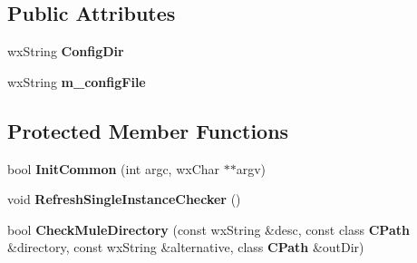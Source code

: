 \subsection*{Public Attributes}
\begin{DoxyCompactItemize}
\item 
wxString {\bfseries ConfigDir}\label{classCamuleAppCommon_a8758418dcb973cb38bc0d5e9db484226}

\item 
wxString {\bfseries m\_\-configFile}\label{classCamuleAppCommon_a0666bf85cc29b760f2d32f9fb4047853}

\end{DoxyCompactItemize}
\subsection*{Protected Member Functions}
\begin{DoxyCompactItemize}
\item 
bool {\bfseries InitCommon} (int argc, wxChar $\ast$$\ast$argv)\label{classCamuleAppCommon_a0a2205f860322c357897456126db69a5}

\item 
void {\bfseries RefreshSingleInstanceChecker} ()\label{classCamuleAppCommon_a73f5608da6911b4b2d9df186f61eed23}

\item 
bool {\bfseries CheckMuleDirectory} (const wxString \&desc, const class {\bf CPath} \&directory, const wxString \&alternative, class {\bf CPath} \&outDir)\label{classCamuleAppCommon_aacfad2565087850df85ae61b1823d781}

\end{DoxyCompactItemize}
